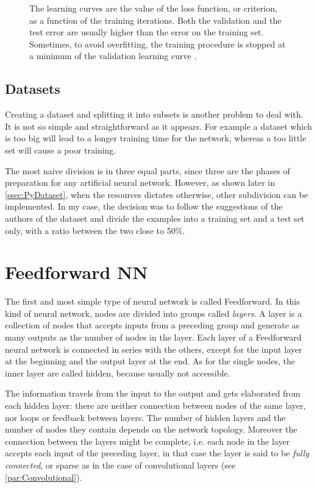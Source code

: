 \begin{figure}[htbp]
	\centering
	
	\caption{The learning curves are the value of the loss function, or criterion, as a function of the training iterations.
	Both the validation and the test error are usually higher than the error on the training set.
	Sometimes, to avoid overfitting, the training procedure is stopped at a minimum of the validation learning curve \cite{duda2012pattern}.
	}
	\label{fig:LVTcurves}
\end{figure}

\subsection{Datasets}
\label{ssec:Datasets}
Creating a dataset and splitting it into subsets is another problem to deal with.
It is not so simple and straightforward as it appears.
For example a dataset which is too big will lead to a longer training time for the network, whereas a too little set will cause a poor training.

The most naive division is in three equal parts, since three are the phases of preparation for any artificial neural network.
However, as shown later in \autoref{ssec:PyDataset}, when the resources dictates otherwise, other subdivision can be implemented.
In my case, the decision was to follow the suggestions of the authors of the dataset and divide the examples into a training set and a test set only, with a ratio between the two close to 50\%.

\section{Feedforward NN}
\label{sec:Feedforward_NN}

The first and most simple type of neural network is called Feedforward.
In this kind of neural network, nodes are divided into groups called \textit{layers}.
A layer is a collection of nodes that accepts inputs from a preceding group and generate as many outputs as the number of nodes in the layer.
Each layer of a Feedforward neural network is connected in series with the others, except for the input layer at the beginning and the output layer at the end.
As for the single nodes, the inner layer are called hidden, because usually not accessible.

The information travels from the input to the output and gets elaborated from each hidden layer: there are neither connection between nodes of the same layer, nor loops or feedback between layers.
The number of hidden layers and the number of nodes they contain depends on the network topology.
Moreover the connection between the layers might be complete, i.e. each node in the layer accepts each input of the preceding layer, in that case the layer is said to be \textit{fully connected}, or sparse as in the case of convolutional layers (see \autoref{par:Convolutional}).

